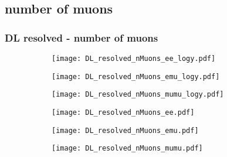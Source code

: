 \documentclass[aspectratio=169,8pt]{beamer}
\begin{document}
\subsection{number of muons}
\begin{frame}
\frametitle{DL resolved - number of muons}
\begin{figure}
\captionsetup[subfigure]{labelformat=empty}
\begin{subfigure}{0.32\textwidth}
\texttt{[image: DL\_resolved\_nMuons\_ee\_logy.pdf]}
\vspace*{-0.15cm}
\end{subfigure}
\hfil
\begin{subfigure}{0.32\textwidth}
\texttt{[image: DL\_resolved\_nMuons\_emu\_logy.pdf]}
\vspace*{-0.15cm}
\end{subfigure}
\hfil
\begin{subfigure}{0.32\textwidth}
\texttt{[image: DL\_resolved\_nMuons\_mumu\_logy.pdf]}
\vspace*{-0.15cm}
\end{subfigure}
\hfil
\begin{subfigure}{0.32\textwidth}
\texttt{[image: DL\_resolved\_nMuons\_ee.pdf]}
\vspace*{-0.15cm}
\end{subfigure}
\hfil
\begin{subfigure}{0.32\textwidth}
\texttt{[image: DL\_resolved\_nMuons\_emu.pdf]}
\vspace*{-0.15cm}
\end{subfigure}
\hfil
\begin{subfigure}{0.32\textwidth}
\texttt{[image: DL\_resolved\_nMuons\_mumu.pdf]}
\vspace*{-0.15cm}
\end{subfigure}
\hfil
\end{figure}
\end{frame}
\newpage
\end{document}
